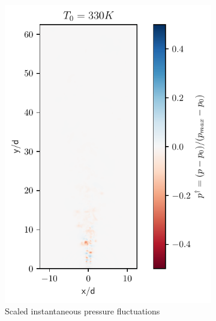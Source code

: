 \begin{figure}[htbp!]
\begin{subfigure}{0.25\textwidth}
	\centering
	\includegraphics[scale=.65]{figures/Plots/vertical/330/pressure_scaled_vert_330.pdf}
	\caption{Scaled instantaneous pressure fluctuations} \label{330_pressure_1}
\end{subfigure}
\hfill
\begin{subfigure}{0.25\textwidth}
	\centering

\end{subfigure}
\end{figure}

